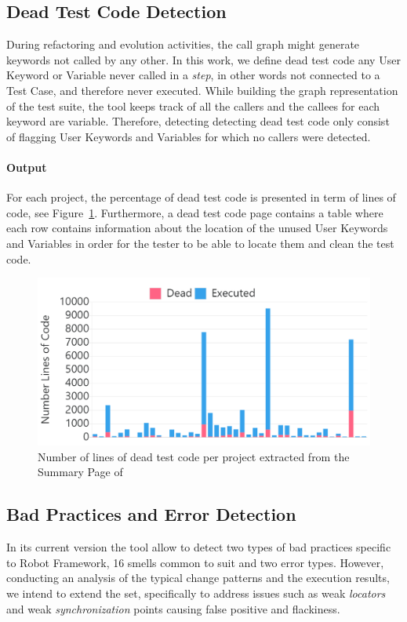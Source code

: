 \subsection{Dead Test Code Detection}

During refactoring and evolution activities, the call graph might generate keywords not called by any other. In this work, we define dead test code any User Keyword or Variable never called in a \emph{step}, in other words not connected to a Test Case, and therefore never executed. While building the graph representation of the test suite, the tool keeps track of all the callers and the callees for each keyword are variable. Therefore, detecting detecting dead test code only consist of flagging User Keywords and Variables for which no callers were detected. 

\paragraph{Output} For each project, the percentage of dead test code is presented in term of lines of code, see Figure~\ref{fig:dead-code}. Furthermore, a dead test code page contains a table where each row contains information about the location of the unused User Keywords and Variables in order for the tester to be able to locate them and clean the test code.

\begin{figure}[t!]
\centering
\includegraphics[width=0.75\columnwidth]{figures/ikora/dead-code.png}
\caption{Number of lines of dead test code per project extracted from the Summary Page of \tool}
\label{fig:dead-code}
\end{figure}

\subsection{Bad Practices and Error Detection}

In its current version the tool allow to detect two types of bad practices specific to Robot Framework, 16 smells common to \gls{suit} and two error types. However, conducting an analysis of the typical change patterns and the execution results, we intend to extend the set, specifically to address issues such as weak \emph{locators} and weak \emph{synchronization} points causing false positive and flackiness.

